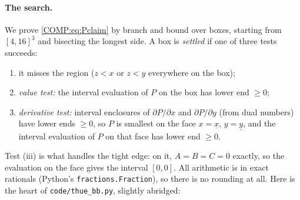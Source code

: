 \documentclass[11pt,openany]{book}
\theoremstyle{plain}
\theoremstyle{definition}
\theoremstyle{remark}
\begin{document}
\paragraph{The search.} We prove \eqref{COMP:eq:Pclaim} by branch and bound over boxes, starting from
$[4,16]^3$ and bisecting the longest side. A box is \emph{settled} if one of three tests succeeds:
\begin{enumerate}[label=(\roman*),nosep]
\item it misses the region ($z<x$ or $z<y$ everywhere on the box);
\item \emph{value test:} the interval evaluation of $P$ on the box has lower end $\ge0$;
\item \emph{derivative test:} interval enclosures of $\partial P/\partial x$ and $\partial P/\partial y$
  (from dual numbers) have lower ends $\ge0$, so $P$ is smallest on the face $x=\underline x$, $y=\underline y$,
  and the interval evaluation of $P$ on that face has lower end $\ge0$.
\end{enumerate}
Test (iii) is what handles the tight edge: on it, $A=B=C=0$ exactly, so the evaluation on the face gives
the interval $[0,0]$. All arithmetic is in exact rationals (Python's
\texttt{fractions.Fraction}), so there is no rounding at all. Here is the heart of
\texttt{code/thue\_bb.py}, slightly abridged:
\end{document}
